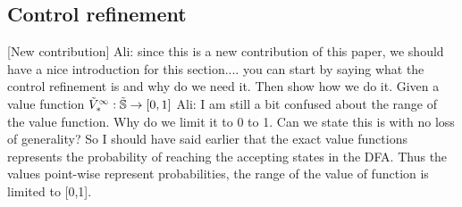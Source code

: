 \documentclass{ifacconf}
\newcommand{\red}[1]{{\color{red} #1}}
\renewcommand{\axx}[1]{{\color{orange} Ali: #1}}
\begin{document}
%
%
%
%
%
%  
%
%
%

\subsection{Control refinement}\label{sec:control}
\red{[New contribution]}
\axx{since this is a new contribution of this paper, we should have a nice introduction for this section.... you can start by saying what the control refinement is and why do we need it. Then show how we do it.}
Given a value function 
	$\tilde V^\infty_\ast:\tilde\S \rightarrow [0,1]$ \axx{I am still a bit confused about the range of the value function. Why do we limit it to 0 to 1. Can we state this is with no loss of generality?} \red{So I should have said earlier that the exact value functions represents the probability of reaching the accepting states in the DFA. Thus the values point-wise represent probabilities, the range of the value of function is limited to [0,1]. }
	
\end{document}
